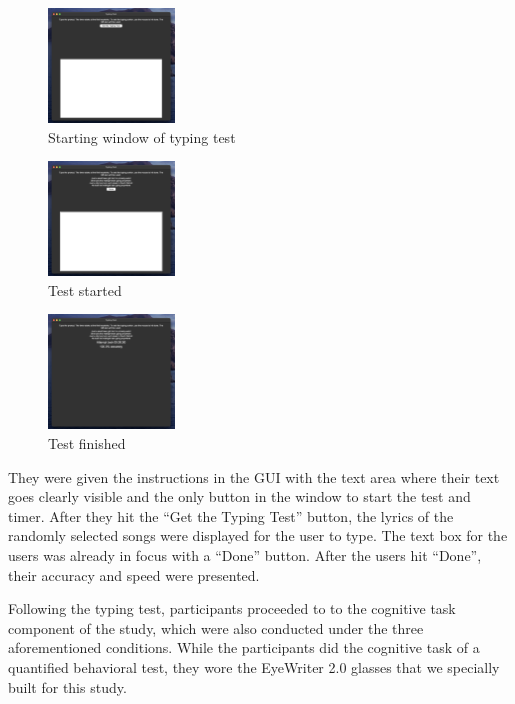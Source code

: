 \documentclass[manuscript, screen, review]{acmart} %
\begin{document}
  \begin{figure}
    \includegraphics[width=0.3\textwidth]{typing_test_1}
    \caption{Starting window of typing test}
  \end{figure}

  \begin{figure}
    \includegraphics[width=0.3\textwidth]{typing_test_2}
    \caption{Test started}
  \end{figure}

  \begin{figure}
    \includegraphics[width=0.3\textwidth]{typing_test_3}
    \caption{Test finished}
  \end{figure}

  They were given the instructions in the GUI with the text area where their text goes clearly visible and the only button in the window to start the test and timer. After they hit the ``Get the Typing Test'' button, the lyrics of the randomly selected songs were displayed for the user to type. The text box for the users was already in focus with a ``Done'' button. After the users hit ``Done'', their accuracy and speed were presented.

  Following the typing test, participants proceeded to to the cognitive task component of the study, which were also conducted under the three aforementioned conditions. While the participants did the cognitive task of a quantified behavioral test, they wore the EyeWriter 2.0 glasses that we specially built for this study.
\end{document}
